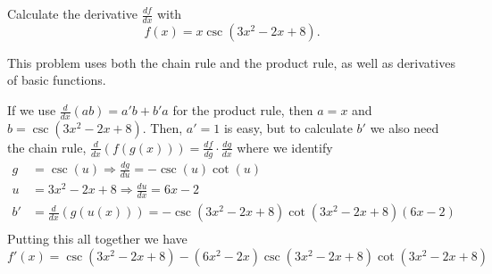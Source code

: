 \documentclass{ximera}
\author{Emma Smith Zbarsky}
\begin{document}
\begin{exercise}

Calculate the derivative $\frac{df}{dx}$ with
\[f(x) = x\csc(3x^2-2x+8).\]


\begin{hint}
This problem uses both the chain rule and the product rule, as well as
derivatives of basic functions.
\end{hint}


\begin{hint}
If we use $\frac{d}{dx}(ab) = a'b+b'a$ for the product rule, then $a=x$
and $b=\csc(3x^2-2x+8)$. Then, $a'=1$ is easy, but to calculate $b'$ we
also need the chain rule,
$\frac{d}{dx}\left(f(g(x))\right) = \frac{df}{dg}\cdot\frac{dg}{dx}$
where we identify \begin{align*}
g &= \csc(u) \Rightarrow \frac{dg}{du} = -\csc(u)\cot(u) \\
u &= 3x^2-2x+8 \Rightarrow \frac{du}{dx} = 6x-2 \\
b' &= \frac{d}{dx}(g(u(x))) = -\csc(3x^2-2x+8)\cot(3x^2-2x+8)(6x-2)\\
\end{align*} Putting this all together we have
\[f'(x) = \csc(3x^2-2x+8)-(6x^2-2x)\csc(3x^2-2x+8)\cot(3x^2-2x+8)\]
\end{hint}


\begin{multipleChoice}
\end{multipleChoice}

\end{exercise}
\end{document}
